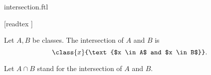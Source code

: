 \documentclass{stex}
\begin{document}
\begin{smodule}{intersection.ftl}

  \begin{forthel}

    [readtex ]
  \end{forthel}

  \begin{forthel}
    \begin{definition}
      Let $A, B$ be classes.
      The intersection of $A$ and $B$ is
      \[\class{x}{\text{$x \in A$ and $x \in B$}}.\]
    \end{definition}

    Let $A \cap B$ stand for the intersection of $A$ and $B$.
  \end{forthel}
\end{smodule}
\end{document}
